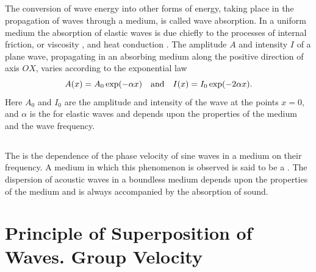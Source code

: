 \subsection{}\label{30.3.7} The conversion of wave energy into other forms of energy, taking place in the propagation of waves through a medium, is called wave absorption. In a uniform medium the absorption of elastic waves is due chiefly to the processes of internal friction, or viscosity , and heat conduction . The amplitude $A$ and intensity $I$ of a plane wave, propagating in an absorbing medium along the positive direction of axis $OX$, varies according to the exponential law
\begin{equation*}%
A(x)= A_{0} \exp(- \alpha x) \qand I (x)= I_{0}\exp(-2 \alpha x).
\end{equation*}
Here $A_{0}$ and $I_{0}$ are the amplitude and intensity of the wave at the points $x = 0$, and $\alpha$ is the  for elastic waves and depends upon the properties of the medium and the wave frequency.

\subsection{}\label{30.3.8} The  is the dependence of the phase velocity of sine waves in a medium on their frequency. A medium in which this phenomenon is observed is said to be a . The dispersion of acoustic waves in a boundless medium depends upon the properties of the medium and is always accompanied by the absorption of sound.

\section[Superposition of Waves]{Principle of Superposition of Waves. Group Velocity}
\label{sec-30.4} 

